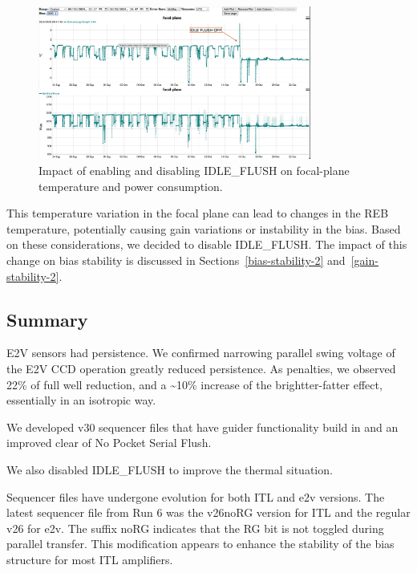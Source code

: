 \begin{figure}
\begin{centering}
\includegraphics[width=0.8\textwidth]{sections/figures/REB_power_temp6_sept24_to_Oct23.png}
\end{centering}
\caption{Impact of enabling and disabling IDLE\_FLUSH on focal-plane temperature and power consumption.}\label{IdleFlushEffect}
\end{figure}

This temperature variation in the focal plane can lead to changes in the REB temperature, potentially causing gain variations or instability in the bias. Based on these considerations, we decided to disable IDLE\_FLUSH. The impact of this change on bias stability is discussed in Sections~\ref{bias-stability-2} and~\ref{gain-stability-2}.

\subsection{Summary}\label{summary}
E2V sensors had persistence. We confirmed narrowing parallel swing voltage of the E2V CCD operation greatly reduced persistence. As penalties, we observed 22\% of
full well reduction, and a \textasciitilde10\% increase of the
brightter-fatter effect, essentially in an isotropic way.

We developed v30 sequencer files that have guider functionality build in and an improved clear of No Pocket Serial Flush.

We also disabled IDLE\_FLUSH to improve the thermal situation.

Sequencer files have undergone evolution for both ITL and e2v versions.
The latest sequencer file from Run 6 was the
v26\label{norg}{noRG} version for ITL and the regular v26
for e2v. The suffix \label{norg}{noRG} indicates that the
RG bit is not toggled during parallel transfer. This modification
appears to enhance the stability of the bias structure for most ITL
amplifiers.

